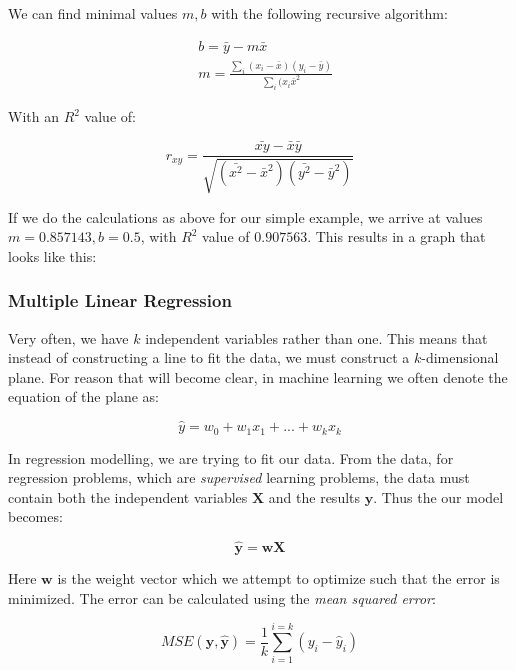 \documentclass[a4paper,english]{article}
\begin{document}
We can find minimal values $m,b$ with the following recursive algorithm:

\begin{align*}
&b = \bar{y} - m\bar{x} \\
&m = \frac{\sum_{i}(x_i - \bar{x})(y_i - \bar{y})}{\sum_{i}(x_i \bar{x}^2}
\end{align*}

With an $R^2$ value of:

$$
r_{xy} = \frac{\bar{xy} - \bar{x}\bar{y}}{\sqrt{(\bar{x^2} - \bar{x}^2)(\bar{y^2} - \bar{y}^2)}}
$$

If we do the calculations as above for our simple example, we arrive at values $m=0.857143, b=0.5$, with $R^2$ value of $0.907563$. This results in a graph that looks like this:\\


\subsubsection{Multiple Linear Regression}

Very often, we have $k$ independent variables rather than one. This means that instead of constructing a line to fit the data, we must construct a $k$-dimensional plane. For reason that will become clear, in machine learning we often denote the equation of the plane as:

$$
\hat{y} = w_0 + w_1x_1 + ... + w_kx_k
$$

In regression modelling, we are trying to fit our data. From the data, for regression problems, which are \textit{supervised} learning problems, the data must contain both the independent variables $\textbf{X}$ and the results $\textbf{y}$. Thus the our model becomes:

$$
\hat{\textbf{y}} = \textbf{w}\textbf{X}
$$

Here $\textbf{w}$ is the weight vector which we attempt to optimize such that the error is minimized. The error can be calculated using the \textit{mean squared error}:

$$
MSE(\textbf{y}, \hat{\textbf{y}}) = \frac{1}{k}\sum_{i=1}^{i=k}(y_i - \hat{y}_i)
$$
\end{document}
